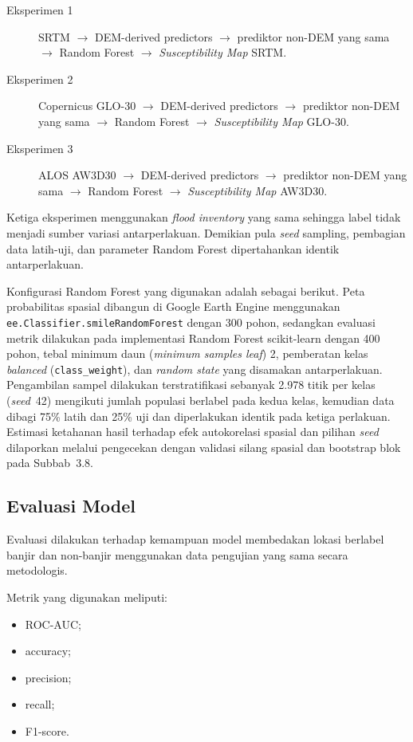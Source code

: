 \documentclass[12pt]{article}
\begin{document}
\begin{description}
\item[Eksperimen 1] SRTM $\rightarrow$ DEM-derived predictors $\rightarrow$
prediktor non-DEM yang sama $\rightarrow$ Random Forest $\rightarrow$
\textit{Susceptibility Map} SRTM.
\item[Eksperimen 2] Copernicus GLO-30 $\rightarrow$ DEM-derived predictors
$\rightarrow$ prediktor non-DEM yang sama $\rightarrow$ Random Forest
$\rightarrow$ \textit{Susceptibility Map} GLO-30.
\item[Eksperimen 3] ALOS AW3D30 $\rightarrow$ DEM-derived predictors
$\rightarrow$ prediktor non-DEM yang sama $\rightarrow$ Random Forest
$\rightarrow$ \textit{Susceptibility Map} AW3D30.
\end{description}

Ketiga eksperimen menggunakan \textit{flood inventory} yang sama sehingga
label tidak menjadi sumber variasi antarperlakuan. Demikian pula \textit{seed}
sampling, pembagian data latih-uji, dan parameter Random Forest dipertahankan
identik antarperlakuan.

Konfigurasi Random Forest yang digunakan adalah sebagai berikut. Peta
probabilitas spasial dibangun di Google Earth Engine menggunakan
\texttt{ee.Classifier.smileRandomForest} dengan 300 pohon, sedangkan
evaluasi metrik dilakukan pada implementasi Random Forest scikit-learn
dengan 400 pohon, tebal minimum daun (\textit{minimum samples leaf}) 2,
pemberatan kelas \textit{balanced} (\texttt{class\_weight}), dan
\textit{random state} yang disamakan antarperlakuan. Pengambilan sampel
dilakukan terstratifikasi sebanyak 2.978 titik per kelas
(\textit{seed}~42) mengikuti jumlah populasi berlabel pada kedua kelas,
kemudian data dibagi 75\% latih dan 25\% uji dan diperlakukan identik pada
ketiga perlakuan. Estimasi ketahanan hasil terhadap efek autokorelasi
spasial dan pilihan \textit{seed} dilaporkan melalui pengecekan dengan
validasi silang spasial dan bootstrap blok pada Subbab~3.8.

\subsection{Evaluasi Model}

Evaluasi dilakukan terhadap kemampuan model membedakan lokasi berlabel
banjir dan non-banjir menggunakan data pengujian yang sama secara
metodologis.

Metrik yang digunakan meliputi:

\begin{itemize}
\item ROC-AUC;
\item accuracy;
\item precision;
\item recall;
\item F1-score.
\end{itemize}
\end{document}
